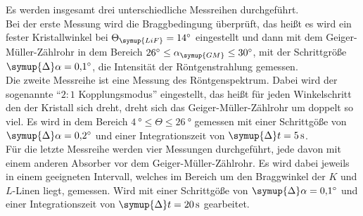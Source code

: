 Es werden insgesamt drei unterschiedliche Messreihen durchgeführt. \\
Bei der erste Messung wird die Braggbedingung überprüft, das heißt es wird ein fester
Kristallwinkel bei $\Theta_\symup{LiF} = \SI{14}{\degree}$ eingestellt und dann mit dem
Geiger-Müller-Zählrohr in dem Bereich $ \SI{26}{\degree} \leq \alpha_\symup{GM} \leq
\SI{30}{\degree}$, mit der Schrittgröße $\symup{\Delta} \alpha = \SI{0.1}{\degree}$, die
Intensität der Röntgenstrahlung gemessen.\\
\newpage
Die zweite Messreihe ist eine Messung des Röntgenspektrum. Dabei wird der sogenannte
\enquote{$2 \colon \!\! 1$ Kopplungsmodus} eingestellt, das heißt für jeden Winkelschritt
den der Kristall sich dreht, dreht sich das Geiger-Müller-Zählrohr um doppelt so viel.
Es wird in dem Bereich $\SI{4}{\degree} \leq \Theta \leq \SI{26}{\degree}$ gemessen
mit einer Schrittgöße von $\symup{\Delta} \alpha = \SI{0.2}{\degree}$ und einer
Integrationszeit von $\symup{\Delta} t = \SI{5}{\second}$.\\
Für die letzte Messreihe werden vier Messungen durchgeführt, jede davon mit einem anderen
Absorber vor dem Geiger-Müller-Zählrohr. Es wird dabei jeweils in einem geeigneten
Intervall, welches im Bereich um den Braggwinkel der $K$ und $L$-Linen liegt,
gemessen. Wird mit einer Schrittgöße von $\symup{\Delta} \alpha
= \SI{0.1}{\degree}$ und einer Integrationszeit von $\symup{\Delta} t = \SI{20}{\second}$
gearbeitet.
